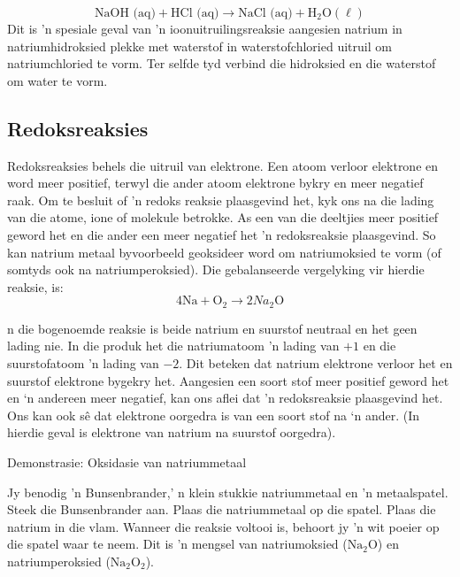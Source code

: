 {{    \begin{equation*}
    \text{NaOH (aq)}+\text{HCl (aq)}\to \text{NaCl (aq)}+{\text{H}}_{2}\text{O} (\ell)
      \end{equation*}
Dit is 'n spesiale geval van 'n ioonuitruilingsreaksie aangesien natrium in natriumhidroksied plekke met waterstof in waterstofchloried uitruil om natriumchloried te vorm. Ter selfde tyd verbind die hidroksied en die waterstof om water te vorm. \par 
\label{m38719*eip-454}
            \subsection*{Redoksreaksies }
            \nopagebreak
Redoksreaksies behels die uitruil van elektrone. Een atoom verloor elektrone en word meer positief, terwyl die ander atoom elektrone bykry en meer negatief raak. Om te besluit of 'n redoks reaksie plaasgevind het, kyk ons na die lading van die atome, ione of molekule betrokke. As een van die  deeltjies meer positief geword het en die ander een meer negatief het 'n redoksreaksie plaasgevind. So kan natrium metaal byvoorbeeld geoksideer word om natriumoksied te vorm (of somtyds ook na natriumperoksied). Die gebalanseerde vergelyking vir hierdie reaksie, is:
\label{m38719*id624}\nopagebreak\noindent{}
    \begin{equation*}
    4\text{Na}+{\text{O}}_{2}\to 2{Na}_{2}{\text{O}}
      \end{equation*}
\par \label{m38719*eip-815}
n die bogenoemde reaksie is beide natrium en suurstof neutraal en het geen lading nie. In die produk het die natriumatoom 'n lading van $+1$ en die suurstofatoom 'n lading van $-2$. Dit beteken dat natrium elektrone verloor het en suurstof elektrone bygekry het. Aangesien een soort stof meer positief geword het en ‘n andereen meer negatief, kan ons aflei dat 'n redoksreaksie plaasgevind het. Ons kan ook s\^{e} dat elektrone oorgedra is van een soort stof na ‘n ander. (In hierdie geval is elektrone van natrium na suurstof oorgedra).
\par \label{m38719*eip-878}
            \begin{g_experiment}{Demonstrasie: Oksidasie van natriummetaal}
            \nopagebreak
            \label{m38719*eip-355}
\begin{minipage}{.6\textwidth}
Jy benodig 'n Bunsenbrander,' n klein stukkie natriummetaal en 'n metaalspatel. Steek die Bunsenbrander aan. Plaas die natriummetaal op die spatel. Plaas die natrium in die vlam. Wanneer die reaksie voltooi is, behoort jy 'n wit poeier op die spatel waar te neem. Dit is 'n mengsel van natriumoksied (${\text{Na}}_{2}\text{O}$) en natriumperoksied (${\text{Na}}_{2}{\text{O}}_{2}$).

\end{minipage}
\end{g_experiment}}}
